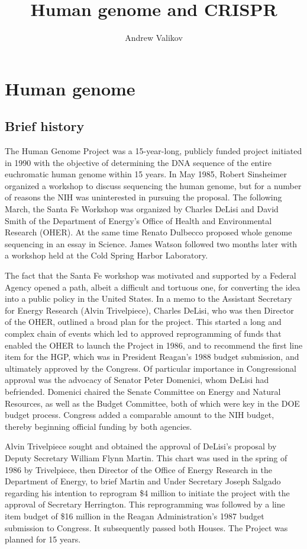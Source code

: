 \documentclass[12pt]{article}
\begin{document}
\title{Human genome and CRISPR}
\author{Andrew Valikov}
\date{}
\maketitle

\section{Human genome}

\subsection{Brief history}

The Human Genome Project was a 15-year-long, publicly funded project initiated in 1990 with the objective of determining the DNA sequence of the entire euchromatic human genome within 15 years. In May 1985, Robert Sinsheimer organized a workshop to discuss sequencing the human genome, but for a number of reasons the NIH was uninterested in pursuing the proposal. The following March, the Santa Fe Workshop was organized by Charles DeLisi and David Smith of the Department of Energy's Office of Health and Environmental Research (OHER). At the same time Renato Dulbecco proposed whole genome sequencing in an essay in Science. James Watson followed two months later with a workshop held at the Cold Spring Harbor Laboratory.

The fact that the Santa Fe workshop was motivated and supported by a Federal Agency opened a path, albeit a difficult and tortuous one, for converting the idea into a public policy in the United States. In a memo to the Assistant Secretary for Energy Research (Alvin Trivelpiece), Charles DeLisi, who was then Director of the OHER, outlined a broad plan for the project. This started a long and complex chain of events which led to approved reprogramming of funds that enabled the OHER to launch the Project in 1986, and to recommend the first line item for the HGP, which was in President Reagan's 1988 budget submission, and ultimately approved by the Congress. Of particular importance in Congressional approval was the advocacy of Senator Peter Domenici, whom DeLisi had befriended. Domenici chaired the Senate Committee on Energy and Natural Resources, as well as the Budget Committee, both of which were key in the DOE budget process. Congress added a comparable amount to the NIH budget, thereby beginning official funding by both agencies.

Alvin Trivelpiece sought and obtained the approval of DeLisi's proposal by Deputy Secretary William Flynn Martin. This chart was used in the spring of 1986 by Trivelpiece, then Director of the Office of Energy Research in the Department of Energy, to brief Martin and Under Secretary Joseph Salgado regarding his intention to reprogram \$4 million to initiate the project with the approval of Secretary Herrington. This reprogramming was followed by a line item budget of \$16 million in the Reagan Administration’s 1987 budget submission to Congress. It subsequently passed both Houses. The Project was planned for 15 years.
\end{document}
